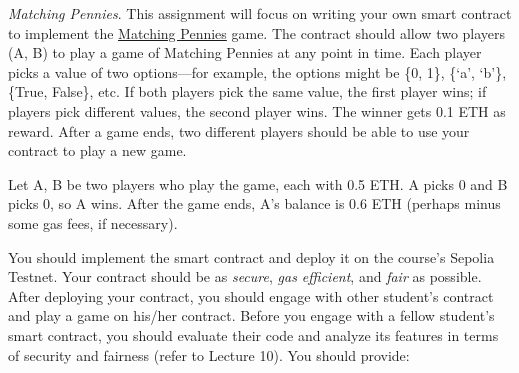 \documentclass[12pt,addpoints,answers]{exam}
\begin{document}
\begin{questions}

\newpage

 {\em Matching Pennies}. This assignment will focus on writing your own smart contract to implement the \href{https://en.wikipedia.org/wiki/Matching_pennies}{Matching Pennies} game. The contract should allow two players (A, B) to play a game of Matching Pennies at any point in time. Each player picks a value of two options---for example, the options might be \{0, 1\}, \{`a’, ‘b’\}, \{True, False\}, etc. If both players pick the same value, the first player wins; if players pick different values, the second player wins. The winner gets 0.1 ETH as reward. After a game ends, two different players should be able to use your contract to play a new game.

 Let A, B be two players who play the game, each with 0.5 ETH.  A picks 0 and B picks 0, so A wins. After the game ends, A’s balance is 0.6 ETH (perhaps minus some gas fees, if necessary).

You should implement the smart contract and deploy it on the course's Sepolia Testnet.  Your contract should be as {\em secure}, {\em gas efficient}, and {\em fair} as possible. After deploying your contract, you should engage with other student's contract and play a game on his/her contract. Before you engage with a fellow student’s smart contract, you should evaluate their code and analyze its features in terms of security and fairness (refer to Lecture 10). You should provide:


\end{questions}
\end{document}
